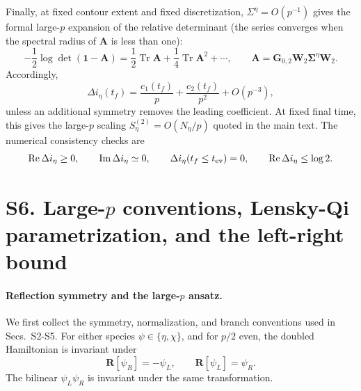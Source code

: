 \documentclass[11pt,a4paper]{article}
\begin{document}
Finally, at fixed contour extent and fixed discretization,
\(\Sigma^\eta=O(p^{-1})\) gives the formal large-\(p\) expansion of the
relative determinant (the series converges when the spectral radius of
\(\mathbf A\) is less than one):
\begin{equation}
  -\frac{1}{2}\log\det(\mathbf 1-\mathbf A)
  =
  \frac{1}{2}\operatorname{Tr}\mathbf A
  +
  \frac{1}{4}\operatorname{Tr}\mathbf A^2
  +
  \cdots,
  \qquad
  \mathbf A
  =
  \mathbf G_{0,2}
  \mathbf W_2
  \boldsymbol\Sigma^\eta
  \mathbf W_2 .
\label{eq:S5-logdet-expansion}
\end{equation}
Accordingly,
\begin{equation}
  \Delta i_\eta(t_f)
  =
  \frac{c_1(t_f)}{p}
  +
  \frac{c_2(t_f)}{p^2}
  +
  O(p^{-3}),
\label{eq:S5-large-p-action-scaling}
\end{equation}
unless an additional symmetry removes the leading coefficient. At fixed final time, this gives
the large-\(p\) scaling
\(S_\eta^{(2)}=O(N_\eta/p)\) quoted in the main text. The numerical
consistency checks are
\begin{equation}
  \operatorname{Re}\Delta i_\eta\geq0,
  \qquad
  \operatorname{Im}\Delta i_\eta\simeq0,
  \qquad
  \Delta i_\eta(t_f\leq t_{\rm ev})=0,
  \qquad
  \operatorname{Re}\Delta i_\eta\leq\log2.
\label{eq:S5-action-checks}
\end{equation}

\section*{S6. Large-\(p\) conventions, Lensky-Qi parametrization, and the left-right bound}
\paragraph*{Reflection symmetry and the large-\(p\) ansatz.}

We first collect the symmetry, normalization, and branch conventions used in
Secs.~S2-S5. For either species
\(\psi\in\{\eta,\chi\}\), and for \(p/2\) even, the doubled Hamiltonian is invariant under
\begin{equation}
\mathbf R[\psi_R]=-\psi_L,
\qquad
\mathbf R[\psi_L]=\psi_R .
\label{eq:S6-reflection}
\end{equation}
The bilinear \(\psi_L\psi_R\) is invariant under the same transformation.
\end{document}
